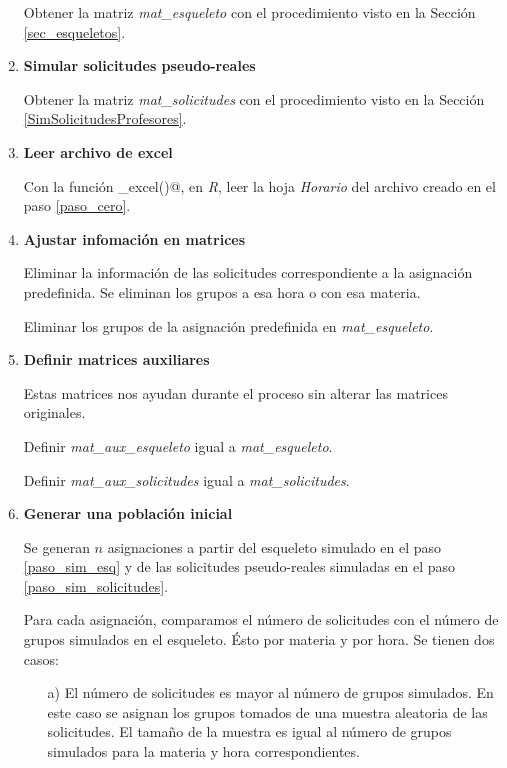 \begin{enumerate}
Obtener la matriz \textit{mat\_esqueleto} con el procedimiento visto en la Sección \ref{sec_esqueletos}.

\item \textbf{Simular solicitudes pseudo-reales} \label{paso_sim_solicitudes}

Obtener la matriz \textit{mat\_solicitudes} con el procedimiento visto en la Sección \ref{SimSolicitudesProfesores}.


\item \textbf{Leer archivo de excel}

Con la función \verb@read_excel()@, en \textit{R}, leer la hoja \textit{Horario} del archivo creado en el paso \ref{paso_cero}.

\item \textbf{Ajustar infomación en matrices}

Eliminar la información de las solicitudes correspondiente a la asignación predefinida. Se eliminan los grupos a esa hora o con esa materia.

Eliminar los grupos de la asignación predefinida en \textit{mat\_esqueleto}.


\item \textbf{Definir matrices auxiliares}

Estas matrices nos ayudan durante el proceso sin alterar las matrices originales.

Definir \textit{mat\_aux\_esqueleto} igual a \textit{mat\_esqueleto}.

Definir \textit{mat\_aux\_solicitudes} igual a \textit{mat\_solicitudes}.



\item \textbf{Generar una población inicial}

Se generan $n$ asignaciones a partir del esqueleto simulado en el paso \ref{paso_sim_esq} y de las solicitudes pseudo-reales simuladas en el paso \ref{paso_sim_solicitudes}.

Para cada asignación, comparamos el número de solicitudes con el número de grupos simulados en el esqueleto. Ésto por materia y por hora. Se tienen dos casos:

\begin{enumerate}
\item[a)] El número de solicitudes es mayor al número de grupos simulados. En este caso se asignan los grupos tomados de una muestra aleatoria de las solicitudes. El tamaño de la muestra es igual al número de grupos simulados para la materia y hora correspondientes.


\end{enumerate}
\end{enumerate}
